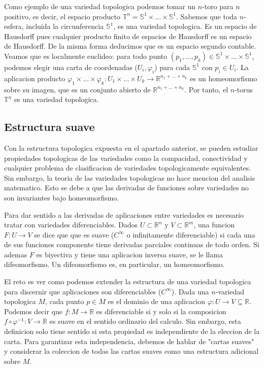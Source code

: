 \documentclass[12pt]{extarticle}
\newcommand{\R}{\mathbb{R}}
\newcommand{\<}{\langle}
\renewcommand{\>}{\rangle}
\theoremstyle{definition}
\begin{document}

Como ejemplo de una variedad topologica podemos tomar un $n$-toro para $n$
positivo, es decir, el espacio producto $\mathbb{T}^n = \mathbb{S}^1 \times ...
\times \mathbb{S}^1$. Sabemos que toda $n$-esfera, incluida la circunferencia
$\mathbb{S}^1$, es una variedad topologica. Es un espacio de Hausdorff pues
cualquier producto finito de espacios de Hausdorff es un espacio de Hausdorff.
De la misma forma deducimos que es un espacio segundo contable. Veamos que es
localmente euclideo: para todo punto $(p_1, ..., p_k) \in \mathbb{S}^1 \times
... \times \mathbb{S}^1$, podemos elegir una carta de coordenadas ($U_i,
\varphi_i$) para cada $\mathbb{S}^1$ con $p_i \in U_i$. La aplicacion producto
$\varphi_1 \times ... \times \varphi_k : U_1 \times ... \times U_k \rightarrow
\mathbb{R}^{n_1 + ... +n_k}$
es un homeomorfismo sobre su imagen, que es un conjunto abierto de
$\mathbb{R}^{n_1 + ... + n_k}$. Por tanto, el $n$-torus $\mathbb{T}^n$ es una
variedad topologica.

\subsection{Estructura suave}
Con la estructura topologica expuesta en el apartado anterior, se pueden
estudiar propiedades topologicas de las variedades como la compacidad,
conectividad y cualquier problema de clasificacion de variedades topologicamente
equivalentes. Sin embargo, la teoria de las variedades topologicas no hace
mencion del analisis matematico. Esto se debe a que las derivadas de funciones
sobre variedades no son invariantes bajo homeomorfismo.

Para dar sentido a las derivadas de aplicaciones entre variedades es necesario
tratar con variedades diferenciables. Dados $U \subset \R^n$ y $V \subset \R^m$,
una funcion $F: U \rightarrow V$ se dice que que es suave ($C^{\infty}$ o
infinitamente diferenciable) si cada una de sus funciones componente tiene
derivadas parciales continuas de todo orden. Si ademas $F$ es biyectiva y tiene
una aplicacion inversa suave, se le llama difeomorfismo. Un difeomorfismo es, en
particular, un homeomorfismo.

El reto es ver como podemos extender la estructura de una variedad topologica
para discernir que aplicaciones son diferenciables ($C^{\infty}$). Dada una
$n$-variedad topologica $M$, cada punto $p \in M$ es el dominio de una aplicacion
$\varphi: U \rightarrow V \subseteq \R$. Podemos decir que $f : M \rightarrow \R$ es diferenciable
si y solo si la composicion $f \circ \varphi^{-1}: V \rightarrow \R$ es suave en
el sentido ordinario del calculo. Sin embargo, esta definicion solo tiene
sentido si esta propiedad es independiente de la eleccion de la carta. Para
garantizar esta independencia, debemos de hablar de "cartas suaves" y considerar
la coleccion de todas las cartas suaves como una estructura adicional sobre $M$.
\end{document}
